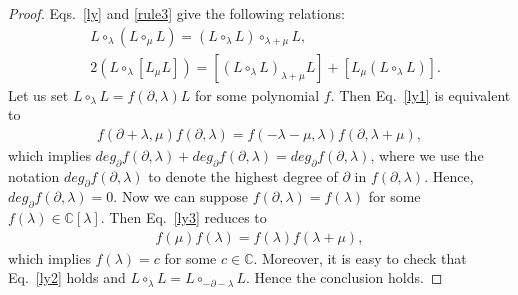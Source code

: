 \documentclass[11pt,letterpaper,reqno]{amsart}
\theoremstyle{definition}
\numberwithin{equation}{section}
\begin{document}
\begin{proof}
Eqs.~\eqref{ly} and \eqref{rule3} give the following relations:
   \begin{align}
      &L\circ_{\lambda}\left(L\circ_{\mu} L\right)=\left(L\circ_{\lambda} L\right)\circ_{\lambda+\mu} L,\label{ly1}\\
      &{2} (L\circ_{\lambda}[L_{\mu}L])=[(L\circ_{\lambda}L)_{\lambda+\mu}L]+[L_{\mu}(L\circ_{\lambda}L)].\label{ly2}
   \end{align}
Let us set $L\circ_\lambda L=f(\partial, \lambda)L$ for some polynomial $f$. Then Eq.~\eqref{ly1} is equivalent to
    \begin{align}\label{ly3}
        f(\partial+\lambda, \mu) f(\partial, \lambda)=f(-\lambda-\mu, \lambda) f(\partial, \lambda+\mu),
    \end{align}
which implies $deg_{\partial} f(\partial, \lambda)+deg_{\partial} f(\partial, \lambda)=deg_{\partial} f(\partial, \lambda)$,
where we use the notation $deg_{\partial} f(\partial, \lambda)$ to denote the highest degree of $\partial$ in $f(\partial, \lambda)$. Hence, $deg_{\partial} f(\partial, \lambda)=0$.
Now we can suppose $f(\partial, \lambda)=f(\lambda)$ for some $f(\lambda)\in \mathbb{C}[\lambda]$. Then Eq.~\eqref{ly3} reduces to %
    \begin{align}
        f(\mu) f(\lambda)=f(\lambda) f(\lambda+\mu),
    \end{align}
which implies $f(\lambda)=c$ for some $c\in \mathbb{C}$. Moreover, it is easy to check that Eq.~\eqref{ly2} holds and $L\circ_\lambda L=L\circ_{-\partial-\lambda} L$. Hence the conclusion holds.
\end{proof}
\end{document}
